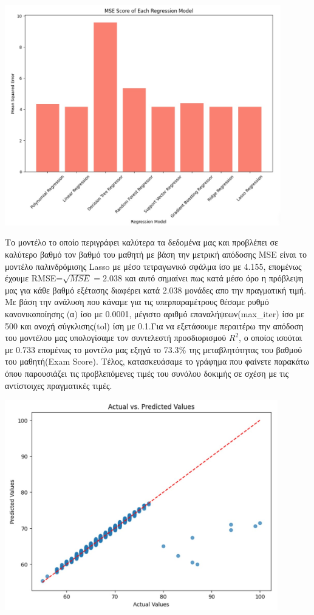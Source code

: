 \documentclass[12pt]{article}
\begin{document}
\begin{center}
    \includegraphics[width=0.9\textwidth]{./images/icon9.jpg}
    
\end{center}

Το μοντέλο το οποίο περιγράφει καλύτερα τα δεδομένα μας και προβλέπει σε καλύτερο βαθμό τον βαθμό του μαθητή με βάση την μετρική απόδοσης MSE είναι το μοντέλο παλινδρόμισης Lasso με μέσο τετραγωνικό σφάλμα ίσο με 4.155, επομένως έχουμε RMSE=\(\sqrt{MSE}=2.038\) και αυτό σημαίνει πως κατά μέσο όρο η πρόβλεψη μας για κάθε βαθμό εξέτασης διαφέρει κατά 2.038 μονάδες απο την πραγματική τιμή. Με βάση την ανάλυση που κάναμε για τις υπερπαραμέτρους θέσαμε ρυθμό κανονικοποίησης (α) ίσο με 0.0001, μέγιστο αριθμό επαναλήψεων(max\_iter) ίσο με 500 και ανοχή σύγκλισης(tol) ίση με 0.1.Για να εξετάσουμε περαιτέρω την απόδοση του μοντέλου μας υπολογίσαμε τον συντελεστή προσδιορισμού \( R^2 \), ο οποίος ισούται με 0.733  επομένως το μοντέλο μας εξηγά το 73.3\(\%\) της μεταβλητότητας του βαθμού του μαθητή(Exam Score). Τέλος, κατασκευάσαμε το γράφημα που φαίνετε παρακάτω όπου παρουσιάζει τις προβλεπόμενες τιμές του συνόλου δοκιμής σε σχέση με τις αντίστοιχες πραγματικές τιμές. 


\begin{center}
    \includegraphics[width=0.89\textwidth]{./images/icon10.jpg}
    
\end{center}
\end{document}
